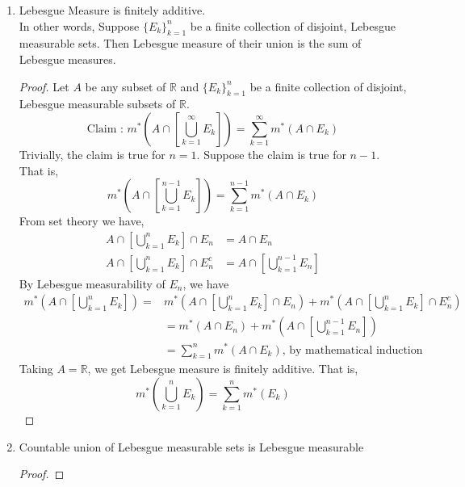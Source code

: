 \begin{enumerate}
	\item Lebesgue Measure is finitely additive.\\
		In other words, Suppose $\{E_k\}_{k = 1}^n$ be a finite collection of disjoint, Lebesgue measurable sets.
		Then Lebesgue measure of their union is the sum of Lebesgue measures.
	\begin{proof}
	Let $A$ be any subset of $\mathbb{R}$ and $\{ E_k \}_{k=1}^n$ be a finite collection of disjoint, Lebesgue measurable subsets of $\mathbb{R}$.
	\begin{equation}
		\text{Claim : }	m^\ast \left( A \cap \left[ \bigcup_{k=1}^\infty E_k\right] \right) = \sum_{k=1}^\infty m^\ast (A \cap E_k)
	\end{equation}
	Trivially, the claim is true for $n=1$.
		Suppose the claim is true for $n-1$.
		That is,
	\begin{equation}
		m^\ast \left( A \cap \left[ \bigcup_{k=1}^{n-1} E_k \right] \right) = \sum_{k=1}^{n-1} m^\ast (A \cap E_k)
	\end{equation}
	From set theory we have,
	\begin{align}
		A \cap \left[ \bigcup_{k=1}^n E_k \right] \cap E_n & = A \cap E_n\\
		A \cap \left[ \bigcup_{k=1}^n E_k \right] \cap E_n^c  & = A \cap \left[ \bigcup_{k=1}^{n-1} E_n \right]
	\end{align}
	By Lebesgue measurability of $E_n$, we have
	\begin{align*}
		m^\ast \left( A \cap \left[ \bigcup_{k=1}^n E_k \right] \right) = & m^\ast \left( A \cap \left[ \bigcup_{k=1}^n E_k \right] \cap E_n \right) + m^\ast \left( A \cap \left[ \bigcup_{k=1}^n E_k \right] \cap E_n^c \right)\\
		& = m^\ast \left( A \cap E_n \right) + m^\ast  \left( A \cap \left[ \bigcup_{k=1}^{n-1} E_n \right] \right) \\
		& =  \sum_{k=1}^n m^\ast \left( A \cap E_k \right) \text{, by mathematical induction}
	\end{align*}
	Taking $A = \mathbb{R}$, we get Lebesgue measure is finitely additive.
		That is,
	\begin{equation}
		m^\ast \left( \bigcup_{k=1}^n E_k \right) = \sum_{k=1}^n m^\ast \left( E_k \right)
	\end{equation}
	\end{proof}
\item Countable union of Lebesgue measurable sets is Lebesgue measurable
	\label{thm:countableunionmeasurable}
	\begin{proof}

\end{proof}
\end{enumerate}
